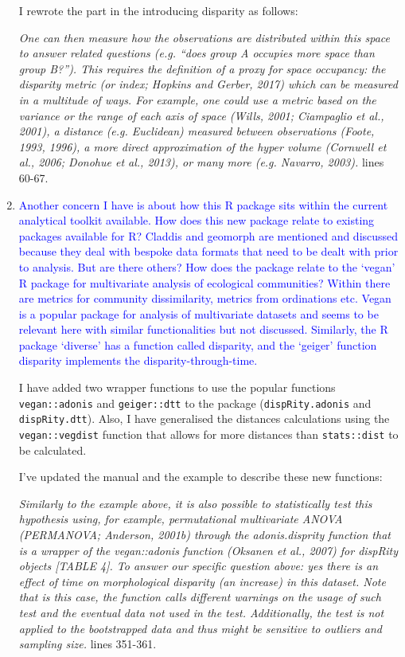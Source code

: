 \documentclass[12pt,letterpaper]{article}
\begin{document}
\begin{enumerate}
I rewrote the part in the introducing disparity as follows:

\textit{One can then measure how the observations are distributed within this space to answer related questions (e.g. ``does group A occupies more space than group B?''). This requires the definition of a proxy for space occupancy: the disparity metric (or index; Hopkins and Gerber, 2017) which can be measured in a multitude of ways. For example, one could use a metric based on the variance or the range of each axis of space (Wills, 2001; Ciampaglio et al., 2001), a distance (e.g. Euclidean) measured between observations (Foote, 1993, 1996), a more direct approximation of the hyper volume (Cornwell et al., 2006; Donohue et al., 2013), or many more (e.g. Navarro, 2003).} lines 60-67.

\item{\textcolor{blue}{Another concern I have is about how this R package sits within the current analytical toolkit available.
How does this new package relate to existing packages available for R?
Claddis and geomorph are mentioned and discussed because they deal with bespoke data formats that need to be dealt with prior to analysis.
But are there others?
How does the package relate to the ‘vegan’ R package for multivariate analysis of ecological communities?
Within there are metrics for community dissimilarity, metrics from ordinations etc.
Vegan is a popular package for analysis of multivariate datasets and seems to be relevant here with similar functionalities but not discussed.
Similarly, the R package ‘diverse’ has a function called disparity, and the ‘geiger’ function disparity implements the disparity-through-time. }}

I have added two wrapper functions to use the popular functions \texttt{vegan::adonis} and \texttt{geiger::dtt} to the package (\texttt{dispRity.adonis} and \texttt{dispRity.dtt}).
Also, I have generalised the distances calculations using the \texttt{vegan::vegdist} function that allows for more distances than \texttt{stats::dist} to be calculated.

I've updated the manual and the example to describe these new functions:

\textit{Similarly to the example above, it is also possible to statistically test this hypothesis using, for example, permutational multivariate ANOVA (PERMANOVA; Anderson, 2001b) through the adonis.disprity function that is a wrapper of the vegan::adonis function (Oksanen et al., 2007) for dispRity objects [TABLE 4]. To answer our specific question above: yes there is an effect of time on morphological disparity (an increase) in this dataset. Note that is this case, the function calls different warnings on the usage of such test and the eventual data not used in the test. Additionally, the test is not applied to the bootstrapped data and thus might be sensitive to outliers and sampling size.} lines 351-361.

\end{enumerate}
\end{document}

